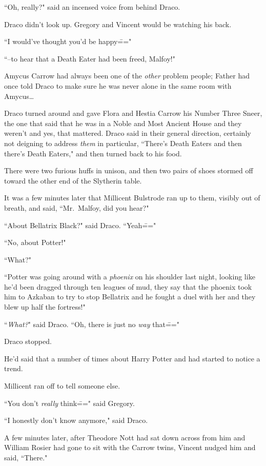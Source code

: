 ``Oh, really?" said an incensed voice from behind Draco.

Draco didn't look up. Gregory and Vincent would be watching his back.

``I would've thought you'd be happy\==="

``\---to hear that a Death Eater had been freed, Malfoy!"

Amycus Carrow had always been one of the \emph{other} problem people; Father had once told Draco to make sure he was never alone in the same room with Amycus{\ldots}

Draco turned around and gave Flora and Hestia Carrow his Number Three Sneer, the one that said that he was in a Noble and Most Ancient House and they weren't and yes, that mattered. Draco said in their general direction, certainly not deigning to address \emph{them} in particular, ``There's Death Eaters and then there's Death Eaters," and then turned back to his food.

There were two furious huffs in unison, and then two pairs of shoes stormed off toward the other end of the Slytherin table.

It was a few minutes later that Millicent Bulstrode ran up to them, visibly out of breath, and said, ``Mr.~Malfoy, did you hear?"

``About Bellatrix Black?" said Draco. ``Yeah\==="

``No, about Potter!"

``What?"

``Potter was going around with a \emph{phoenix} on his shoulder last night, looking like he'd been dragged through ten leagues of mud, they say that the phoenix took him to Azkaban to try to stop Bellatrix and he fought a duel with her and they blew up half the fortress!"

``\emph{What?}" said Draco. ``Oh, there is just no \emph{way} that\==="

Draco stopped.

He'd said that a number of times about Harry Potter and had started to notice a trend.

Millicent ran off to tell someone else.

``You don't \emph{really} think\===" said Gregory.

``I honestly don't know anymore," said Draco.

A few minutes later, after Theodore Nott had sat down across from him and William Rosier had gone to sit with the Carrow twins, Vincent nudged him and said, ``There."

